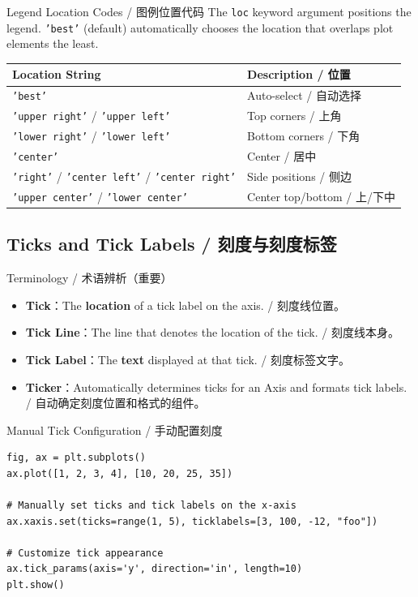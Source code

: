 \documentclass[11pt,a4paper]{article}
\begin{document}
\begin{concept}{Legend Location Codes / 图例位置代码}
    The \texttt{loc} keyword argument positions the legend. \texttt{'best'} (default) automatically chooses the location that overlaps plot elements the least.

    \medskip
    \centering
    \small
    \begin{tabularx}{\linewidth}{@{}lX@{}}
    \toprule
    \textbf{Location String} & \textbf{Description / 位置} \\ \midrule
    \texttt{'best'} & Auto-select / 自动选择 \\
    \texttt{'upper right'} / \texttt{'upper left'} & Top corners / 上角 \\
    \texttt{'lower right'} / \texttt{'lower left'} & Bottom corners / 下角 \\
    \texttt{'center'} & Center / 居中 \\
    \texttt{'right'} / \texttt{'center left'} / \texttt{'center right'} & Side positions / 侧边 \\
    \texttt{'upper center'} / \texttt{'lower center'} & Center top/bottom / 上/下中 \\ \bottomrule
    \end{tabularx}
\end{concept}

\subsection{Ticks and Tick Labels / 刻度与刻度标签}

\begin{concept}{Terminology / 术语辨析（重要）}
    \begin{itemize}[itemsep=0.3em]
        \item \textbf{Tick}：The \textbf{location} of a tick label on the axis. / 刻度线位置。
        \item \textbf{Tick Line}：The line that denotes the location of the tick. / 刻度线本身。
        \item \textbf{Tick Label}：The \textbf{text} displayed at that tick. / 刻度标签文字。
        \item \textbf{Ticker}：Automatically determines ticks for an Axis and formats tick labels. / 自动确定刻度位置和格式的组件。
    \end{itemize}
\end{concept}

\begin{examplebox}{Manual Tick Configuration / 手动配置刻度}
\begin{lstlisting}
fig, ax = plt.subplots()
ax.plot([1, 2, 3, 4], [10, 20, 25, 35])

# Manually set ticks and tick labels on the x-axis
ax.xaxis.set(ticks=range(1, 5), ticklabels=[3, 100, -12, "foo"])

# Customize tick appearance
ax.tick_params(axis='y', direction='in', length=10)
plt.show()
\end{lstlisting}
\end{examplebox}
\end{document}
